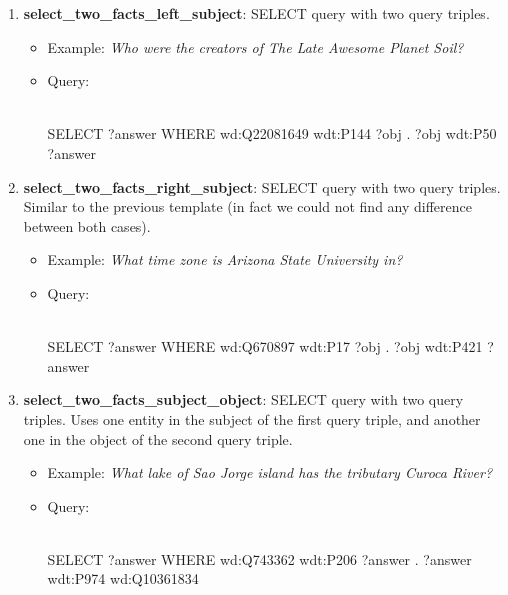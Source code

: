 \begin{enumerate}
    \item \textbf{select\_two\_facts\_left\_subject}: SELECT query with two query triples.
    \begin{itemize}
        \item Example: \textit{Who were the creators of The Late Awesome Planet Soil?}
        \item Query:\\
        \mbox{}\\
        \begin{sparqlcode}[]
SELECT ?answer WHERE { 
    wd:Q22081649 wdt:P144 ?obj . 
    ?obj wdt:P50 ?answer
}
        \end{sparqlcode}
    \end{itemize}
    
    \item \textbf{select\_two\_facts\_right\_subject}: SELECT query with two query triples. Similar to 
    the previous template (in fact we could not find any difference between both cases).
    \begin{itemize}
        \item Example: \textit{What time zone is Arizona State University in?}
        \item Query:\\
        \mbox{}\\
        \begin{sparqlcode}[]
SELECT ?answer WHERE { 
    wd:Q670897 wdt:P17 ?obj . 
    ?obj wdt:P421 ?answer
}
        \end{sparqlcode}
    \end{itemize}
    
    \item \textbf{select\_two\_facts\_subject\_object}: SELECT query with two query triples. Uses one 
    entity in the subject of the first query triple, and another one in the object of the second 
    query triple.
    \begin{itemize}
        \item Example: \textit{What lake of Sao Jorge island has the tributary Curoca River?}
        \item Query:\\
        \mbox{}\\
        \begin{sparqlcode}[]
SELECT ?answer WHERE { 
    wd:Q743362 wdt:P206 ?answer . 
    ?answer wdt:P974 wd:Q10361834
}
        \end{sparqlcode}
    \end{itemize}
    

\end{enumerate}
